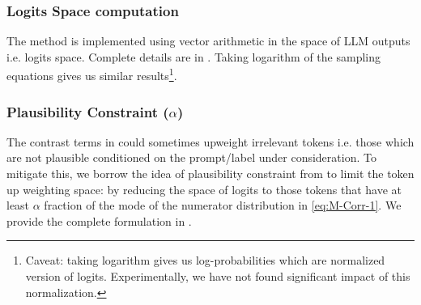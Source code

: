 
\subsubsection{Logits Space computation}
The \corrsyn{} method is implemented using vector arithmetic in the space of LLM outputs i.e. logits space. Complete details are in . Taking logarithm of the \corrsyn{} sampling equations gives us similar results\footnote{Caveat: taking logarithm gives us log-probabilities which are normalized version of logits. Experimentally, we have not found significant impact of this normalization.}.


\subsubsection{Plausibility Constraint ($\alpha$)}

The contrast terms in \corrsyn{} could sometimes upweight irrelevant tokens i.e. those which are not plausible conditioned on the prompt/label under consideration. To mitigate this, we borrow the idea of plausibility constraint from \cite{li2023contrastive, o2023contrastive} to limit the token up weighting space: by reducing the space of logits to those tokens that have at least $\alpha$ fraction of the mode of the numerator distribution in \eqref{eq:M-Corr-1}. We provide the complete formulation in .
 